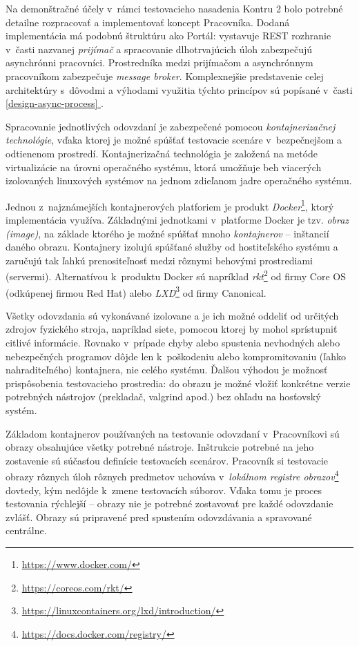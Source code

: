 \documentclass[
  digital, %
  oneside, %
  table,   %
  lof,     %
  lot,   %
]{fithesis3}
\newcommand*{\fullref}[1]{\hyperref[{#1}]{\ref*{#1} \nameref*{#1}}}
\newcommand*{\footurl}[1]{\footnote{\url{#1}}}
\begin{document}
Na demonštračné účely v~rámci testovacieho nasadenia Kontru 2 bolo potrebné detailne rozpracovať a implementovať koncept Pracovníka. Dodaná implementácia má podobnú štruktúru ako Portál: vystavuje REST rozhranie v~časti nazvanej \emph{prijímač} a spracovanie dlhotrvajúcich úloh zabezpečujú asynchrónni pracovníci. Prostredníka medzi prijímačom a asynchrónnym pracovníkom zabezpečuje \emph{message broker}. Komplexnejšie predstavenie celej architektúry s~dôvodmi a výhodami využitia týchto princípov sú popísané v~časti \fullref{design-async-process}. 

Spracovanie jednotlivých odovzdaní je zabezpečené pomocou \emph{kontajnerizačnej technológie}, vďaka ktorej je možné spúšťať testovacie scenáre v~bezpečnejšom a odtienenom prostredí. Kontajnerizačná technológia je založená na metóde virtualizácie na úrovni operačného systému, ktorá umožňuje beh viacerých izolovaných linuxových systémov na jednom zdieľanom jadre operačného systému\cite{linux-containers-rh}. 

Jednou z~najznámejších kontajnerových platforiem je produkt \emph{Docker}\footnote{\url{https://www.docker.com/}}, ktorý implementácia využíva. Základnými jednotkami v~platforme Docker je tzv. \emph{obraz (image)}, na základe ktorého je možné spúšťať mnoho \emph{kontajnerov} -- inštancií daného obrazu. Kontajnery izolujú spúšťané služby od hostiteľského systému a zaručujú tak ľahkú prenositeľnosť medzi rôznymi behovými prostrediami (servermi)\cite{docker-stuff}. Alternatívou k~produktu Docker sú napríklad \emph{rkt}\footurl{https://coreos.com/rkt/} od firmy Core OS (odkúpenej firmou Red Hat) alebo \emph{LXD}\footurl{https://linuxcontainers.org/lxd/introduction/} od firmy Canonical. 

Všetky odovzdania sú vykonávané izolovane a je ich možné oddeliť od určitých zdrojov fyzického stroja, napríklad siete, pomocou ktorej by mohol sprístupniť citlivé informácie. Rovnako v~prípade chyby alebo spustenia nevhodných alebo nebezpečných programov dôjde len k~poškodeniu alebo kompromitovaniu (ľahko nahraditeľného) kontajnera, nie celého systému. Ďalšou výhodou je možnosť prispôsobenia testovacieho prostredia: do obrazu je možné vložiť konkrétne verzie potrebných nástrojov (prekladač, valgrind apod.) bez ohľadu na hosťovský systém.

Základom kontajnerov používaných na testovanie odovzdaní v~Pracovníkovi sú obrazy obsahujúce všetky potrebné nástroje. Inštrukcie potrebné na jeho zostavenie sú súčasťou definície testovacích scenárov. Pracovník si testovacie obrazy rôznych úloh rôznych predmetov uchováva v~\emph{lokálnom registre obrazov}\footnote{\url{https://docs.docker.com/registry/}} dovtedy, kým nedôjde k~zmene testovacích súborov. Vďaka tomu je proces testovania rýchlejší -- obrazy nie je potrebné zostavovať pre každé odovzdanie zvlášť. Obrazy sú pripravené pred spustením odovzdávania a spravované centrálne.
\end{document}
